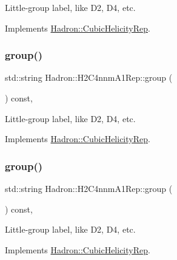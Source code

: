 Little-\/group label, like D2, D4, etc. 

Implements \mbox{\hyperlink{structHadron_1_1CubicHelicityRep_a101a7d76cd8ccdad0f272db44b766113}{Hadron\+::\+Cubic\+Helicity\+Rep}}.

\mbox{\label{structHadron_1_1H2C4nnmA1Rep_a857a824d79d2b5d7bf3b4e4641f171cb}} 
\subsubsection{\texorpdfstring{group()}{group()}\hspace{0.1cm}{\footnotesize\ttfamily [2/3]}}
{\footnotesize\ttfamily std\+::string Hadron\+::\+H2\+C4nnm\+A1\+Rep\+::group (\begin{DoxyParamCaption}{ }\end{DoxyParamCaption}) const\hspace{0.3cm}{\ttfamily [inline]}, {\ttfamily [virtual]}}

Little-\/group label, like D2, D4, etc. 

Implements \mbox{\hyperlink{structHadron_1_1CubicHelicityRep_a101a7d76cd8ccdad0f272db44b766113}{Hadron\+::\+Cubic\+Helicity\+Rep}}.

\mbox{\label{structHadron_1_1H2C4nnmA1Rep_a857a824d79d2b5d7bf3b4e4641f171cb}} 
\subsubsection{\texorpdfstring{group()}{group()}\hspace{0.1cm}{\footnotesize\ttfamily [3/3]}}
{\footnotesize\ttfamily std\+::string Hadron\+::\+H2\+C4nnm\+A1\+Rep\+::group (\begin{DoxyParamCaption}{ }\end{DoxyParamCaption}) const\hspace{0.3cm}{\ttfamily [inline]}, {\ttfamily [virtual]}}

Little-\/group label, like D2, D4, etc. 

Implements \mbox{\hyperlink{structHadron_1_1CubicHelicityRep_a101a7d76cd8ccdad0f272db44b766113}{Hadron\+::\+Cubic\+Helicity\+Rep}}.

